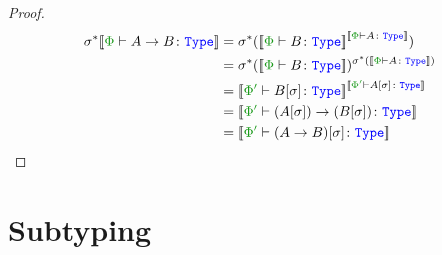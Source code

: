 \documentclass{report}
\begin{document}
\begin{framed}
\begin{proof}
        \case{\tfun}
        \begin{align*}
            \si\star\deno{\typerelation{\P}{\ab}{\type}} &= \si\star(\deno{\typerelation{\P}{B}{\type}}^{\deno{\typerelation{\P}{A}{\type}}})\\
            &=\si\star(\deno{\typerelation{\P}{B}{\type}})^{\si\star(\deno{\typerelation{\P}{A}{\type}})}\\
            & = \deno{\typerelation{\P'}{B\ssi}{\type}}^{\deno{\typerelation{\P'}{A\ssi}{\type}}}\\
            & = \deno{\typerelation{\P'}{\fntype{(A\ssi)}{(B\ssi)}}{\type}}\\
            & = \deno{\typerelation{\P'}{(\ab)\ssi}{\type}}\\
        \end{align*}
    \end{proof}
\end{framed}

\section{Subtyping}
\end{document}
